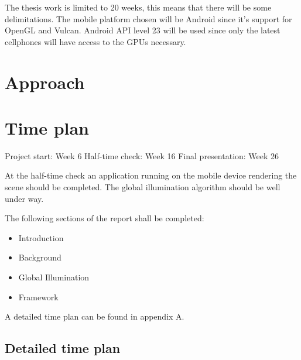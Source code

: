 \documentclass[a4paper, 12pt]{article}
\begin{document}
The thesis work is limited to 20 weeks, this means that there will be some delimitations.
The mobile platform chosen will be Android since it's support for OpenGL and Vulcan. Android API level 23 will be used since only the latest cellphones will have access to the GPUs necessary.

\section{Approach}
\label{sec:Approach}



\section{Time plan}
\label{sec:Time plan}

Project start: Week 6
Half-time check: Week 16
Final presentation: Week 26

At the half-time check an application running on the mobile device rendering the scene should be completed. The global illumination algorithm should be well under way.

The following sections of the report shall be completed:
\begin{itemize}
  \item Introduction
  \item Background
  \item Global Illumination
  \item Framework
\end{itemize}

A detailed time plan can be found in appendix A.




\newpage

\begin{appendices}

\section{Detailed time plan}
\label{app:timeplan}

\end{appendices}
\end{document}

